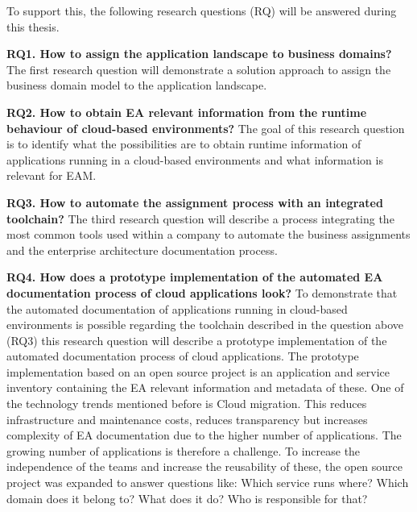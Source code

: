 
To support this, the following research questions (RQ) will be answered during this thesis.

\textbf{RQ1. How to assign the application landscape to business domains?}
The first research question will demonstrate a solution approach to assign the business domain model to the application landscape.

\textbf{RQ2. How to obtain EA relevant information from the runtime behaviour of cloud-based environments?}
The goal of this research question is to identify what the possibilities are to obtain runtime information of applications running in a cloud-based environments and what information is relevant for EAM.

\textbf{RQ3. How to automate the assignment process with an integrated toolchain?}
The third research question will describe a process integrating the most common tools used within a company to automate the business assignments and the enterprise architecture documentation process.

\textbf{RQ4. How does a prototype implementation of the automated EA documentation process of cloud applications look?}
To demonstrate that the automated documentation of applications running in cloud-based environments is possible regarding the toolchain described in the question above (RQ3) this research question will describe a prototype implementation of the automated documentation process of cloud applications. The prototype implementation based on an open source project is an application and service inventory containing the EA relevant information and metadata of these. One of the technology trends mentioned before is Cloud migration. This reduces infrastructure and maintenance costs, reduces transparency but increases complexity of EA documentation due to the higher number of applications. The growing number of applications is therefore a challenge. To increase the independence of the teams and increase the reusability of these,
the open source project was expanded to answer questions like: Which service runs where? Which domain does it belong to? What does it do? Who is responsible for that?

